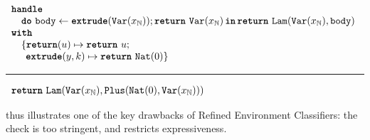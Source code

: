 \begin{code}
  \begin{efflst}
    $\begin{array}{l}
      \textbf{\texttt{handle}} \\
      \quad \texttt{\textbf{do}} \,\, {\texttt{body}} \leftarrow {\textbf{\texttt{extrude}}({\texttt{Var}(x_{\mathbb{N}})}); \texttt{\textbf{return}} \,\, {\texttt{Var}(x_{\mathbb{N}})}} \, \textbf{\texttt{in}} \, {\texttt{\textbf{return}} \,\, {\texttt{Lam}(\texttt{Var}(x_{\mathbb{N}}), \texttt{body})}} \\
      \textbf{\texttt{with}} \\
      \quad \{ \textbf{\texttt{return}}(u) \mapsto \texttt{\textbf{return}} \,\, {u}; \\
      \quad \; \, \textbf{\texttt{extrude}}(y, k) \mapsto { \texttt{\textbf{return}} \,\, {\texttt{Nat}(0)}} \}\\
    \end{array}$

    \vspace{2mm} 
\textcolor{effComment}{\hrule height 0.2mm \relax}
\vspace{2mm} 

\textcolor{effComment}{$\begin{array}{l}\texttt{\textbf{return}} \,\, {\texttt{Lam}(\texttt{Var}(x_{\mathbb{N}}), \texttt{Plus}(\texttt{Nat}({0}), \texttt{Var}(x_{\mathbb{N}})))}\end{array}$}

\end{efflst}
\label{listing:efflang-no-scope-extrusion}
\end{code}

 thus illustrates one of the key drawbacks of Refined Environment Classifiers: the check is too stringent, and restricts expressiveness. 

